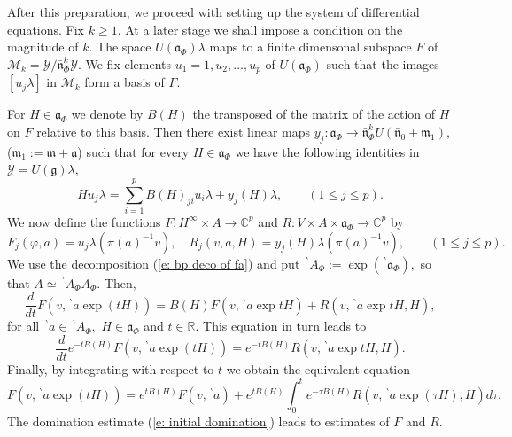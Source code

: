 \documentclass[12pt,a4paper]{article}
\def\qquad{\quad\quad}
\def\msy#1{{\mathbb #1}}
\def\C{{\msy C}}
\def\R{{\msy R}}
\def\gf{\varphi}
\def\gl{\lambda}
\def\got#1{\mathfrak #1}
\def\fa{{\got a}}
\def\fg{{\got g}}
\def\fm{{\got m}}
\def\fn{{\got n}}
\def\to{\rightarrow}
\def\cM{{\mathcal M}}
\def\cY{{\mathcal Y}}
\numberwithin{Thm}{section}
\numberwithin{equation}{section}
\def\bfn{\bar\fn}
\numberwithin{equation}{section}
\def\bfn{{\bar \fn}}
\def\bp{\!{\,}^\backprime}
\begin{document}
After this preparation, we proceed with setting up the system of differential equations. 
Fix $k \geq 1.$ At a later stage we shall impose a condition on the magnitude of $k.$ 
The space $U(\fa_\Phi)\gl$ maps to a finite dimensonal
subspace $F$ of $\cM_k= \cY/\bfn_\Phi^k \cY.$ We fix elements $u_1=1, u_2, \ldots , u_p$ 
of $U(\fa_\Phi)$ such that the images $[u_j \gl]$ in $\cM_k$ form a basis 
of $F.$

For $H \in \fa_\Phi$ we denote by $B(H)$ the transposed of the 
matrix of the action of $H$ 
on $F$ relative to this basis. Then there exist linear maps
$y_j: \fa_\Phi \to  \bfn_\Phi^k U(\bfn_0 +\fm_{1}),$ 
($\fm_1 := \fm + \fa$) such that for every $H \in \fa_\Phi$ we have
the following identities in $\cY = U(\fg) \gl,$ 
$$ 
H u_j \gl = \sum_{i=1}^p B(H)_{ji} u_i \gl + y_j(H)\gl, \qquad  (1 \leq j \leq p).
$$%
We now define the functions $F: H^\infty \times A \to \C^p$ and $R: V \times 
A \times \fa_{\Phi} \to \C^p$ 
by 
$$
F_j(\gf, a) = u_j \gl( \pi(a)^{-1}v  ), \quad R_j(v, a, H) = y_j(H)\gl (\pi(a)^{-1}v), 
\qquad (1 \leq j \leq p).
$$%
We use the decomposition (\ref{e: bp deco of fa}) and put $\bp A_\Phi :=\exp (\bp \fa_\Phi),$ 
so that $A \simeq \bp A_\Phi A_\Phi.$ 
Then,
$$ 
\frac{d}{dt} F(v, \bp a \exp ( tH)) =  B(H) F(v, \bp a \exp tH) + 
R(v, \bp a \exp tH, H),
$$%
for all $\bp a \in \bp A_{\Phi},$ $H \in \fa_\Phi$ and $t \in \R.$ This equation in turn leads
to 
$$ 
\frac{d}{dt} e^{-tB(H)} F(v, \bp a \exp (tH) ) =  e^{-tB(H)} R(v, \bp a \exp tH, H).
$$%
Finally, by integrating with respect to $t$ we obtain the equivalent equation
\begin{equation}
\label{e: integral expression F}
F(v, \bp a \exp (tH))  = e^{tB(H)} F(v, \bp a) + e^{tB(H)} \int_0^t e^{-\tau B(H)} R(v, \bp a \exp (\tau H) , H) d \tau. 
\end{equation}
The domination estimate (\ref{e: initial domination}) leads
to estimates of $F$ and $R.$ 
\end{document}
